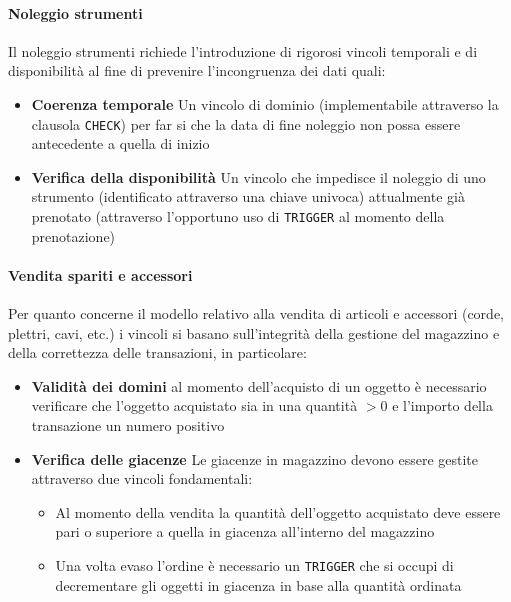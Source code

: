 \paragraph{Noleggio strumenti}
Il noleggio strumenti richiede l'introduzione di rigorosi vincoli temporali e di disponibilità al fine di prevenire l'incongruenza dei dati quali: 
\begin{itemize}
    \item \textbf{Coerenza temporale} Un vincolo di dominio (implementabile attraverso la clausola \texttt{CHECK}) per far si che la data di fine noleggio non possa essere antecedente a quella di inizio
    \item \textbf{Verifica della disponibilità} Un vincolo che impedisce il noleggio di uno strumento (identificato attraverso una chiave univoca) attualmente già prenotato (attraverso l'opportuno uso di \texttt{TRIGGER} al momento della prenotazione)
\end{itemize}
\paragraph{Vendita spariti e accessori}
Per quanto concerne il modello relativo alla vendita di articoli e accessori (corde, plettri, cavi, etc.) i vincoli si basano sull'integrità della gestione del magazzino e della correttezza delle transazioni, in particolare: 
\begin{itemize}
    \item \textbf{Validità dei domini} al momento dell'acquisto di un oggetto è necessario verificare che l'oggetto acquistato sia in una quantità $> 0$ e l'importo della transazione un numero positivo
    \item \textbf{Verifica delle giacenze} Le giacenze in magazzino devono essere gestite attraverso due vincoli fondamentali: 
    \begin{itemize}
        \item Al momento della vendita la quantità dell'oggetto acquistato deve essere pari o superiore a quella in giacenza all'interno del magazzino
        \item Una volta evaso l'ordine è necessario un \texttt{TRIGGER} che si occupi di decrementare gli oggetti in giacenza in base alla quantità ordinata 
    \end{itemize}
\end{itemize}
